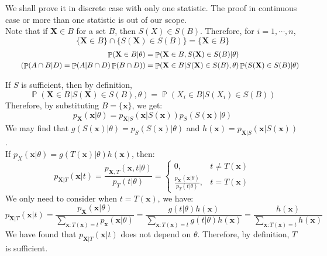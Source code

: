 \documentclass{huhtakm-template-book-v2}
\DeclareMathOperator{\prob}{\mathbb{P}}
\begin{document}
\begin{proofing}
	We shall prove it in discrete case with only one statistic. The proof in continuous case or more than one statistic is out of our scope.\\
	Note that if $\mathbf{X}\in B$ for a set $B$, then $S(X)\in S(B)$. Therefore, for $i=1,\cdots,n$,
	\begin{equation*}
		\{\mathbf{X}\in B\}\cap\{S(\mathbf{X})\in S(B)\}=\{\mathbf{X}\in B\}
	\end{equation*}
	\begin{align*}
		\prob(\mathbf{X}\in B|\theta)&=\prob(\mathbf{X}\in B,S(\mathbf{X})\in S(B)|\theta)\\
		\tag{$\prob(A\cap B|D)=\prob(A|B\cap D)\prob(B\cap D)$}
		&=\prob(\mathbf{X}\in B|S(\mathbf{X})\in S(B),\theta)\prob(S(\mathbf{X})\in S(B)|\theta)
	\end{align*}
	
	\newpage
	If $S$ is sufficient, then by definition,
	\begin{equation*}
		\prob(\mathbf{X}\in B|S(\mathbf{X})\in S(B),\theta)=\prob(X_{i}\in B|S(X_{i})\in S(B))
	\end{equation*}
	Therefore, by substituting $B=\{\mathbf{x}\}$, we get:
	\begin{equation*}
		p_{\mathbf{X}}(\mathbf{x}|\theta)=p_{\mathbf{X}|S}(\mathbf{x}|S(\mathbf{x}))p_{S}(S(\mathbf{x})|\theta)
	\end{equation*}
	We may find that $g(S(\mathbf{x})|\theta)=p_{S}(S(\mathbf{x})|\theta)$ and $h(\mathbf{x})=p_{\mathbf{X}|S}(\mathbf{x}|S(\mathbf{x}))$.\\
	If $p_{X}(\mathbf{x}|\theta)=g(T(\mathbf{x})|\theta)h(\mathbf{x})$, then:
	\begin{equation*}
		p_{\mathbf{X}|T}(\mathbf{x}|t)=\frac{p_{\mathbf{X},T}(\mathbf{x},t|\theta)}{p_{T}(t|\theta)}=\begin{cases}
			0, &t\neq T(\mathbf{x})\\
			\frac{p_{\mathbf{X}}(\mathbf{x}|\theta)}{p_{T}(t|\theta)}, &t=T(\mathbf{x})
		\end{cases}
	\end{equation*}
	 We only need to consider when $t=T(\mathbf{x})$, we have:
	\begin{equation*}
		p_{\mathbf{X}|T}(\mathbf{x}|t)=\frac{p_{\mathbf{X}}(\mathbf{x}|\theta)}{\sum_{\mathbf{x}:T(\mathbf{x})=t}p_{\mathbf{x}}(\mathbf{x}|\theta)}=\frac{g(t|\theta)h(\mathbf{x})}{\sum_{\mathbf{x}:T(\mathbf{x})=t}g(t|\theta)h(\mathbf{x})}=\frac{h(\mathbf{x})}{\sum_{\mathbf{x}:T(\mathbf{x})=t}h(\mathbf{x})}
	\end{equation*}
	We have found that $p_{\mathbf{X}|T}(\mathbf{x}|t)$ does not depend on $\theta$. Therefore, by definition, $T$ is sufficient.
\end{proofing}
\end{document}
